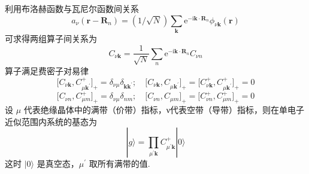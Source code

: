 利用布洛赫函数与瓦尼尔函数间关系
\begin{equation}
  a_{\nu}(\boldsymbol{r}-\boldsymbol{R}_{n})=(1/\sqrt{N})\sum_{\boldsymbol{k}}
  \mathrm{e}^{-\mathrm{i}\boldsymbol{k}\cdot\boldsymbol{R}_{n}}\phi_{\nu\boldsymbol{k}}(\boldsymbol{r})
\end{equation}
可求得两组算子间关系为
\begin{equation}
  C_{\nu\boldsymbol{k}}=\frac{1}{\sqrt{N}}\sum_{n}
  \mathrm{e}^{-\mathrm{i}\boldsymbol{k}\cdot\boldsymbol{R}_{n}}C_{\nu n}
\end{equation}
算子满足费密子对易律
\begin{equation}
  \bigl[C_{\nu\boldsymbol{k}},C_{\mu\boldsymbol{k}^{\prime}}^{+}\bigr]_{+}
  =\delta_{\nu\mu}\delta_{\boldsymbol{k}\boldsymbol{k}^{\prime}};
  \quad
  \bigl[C_{\nu\boldsymbol{k}},C_{\mu\boldsymbol{k}^{\prime}}\bigr]_{+}
  =\bigl[C_{\nu\boldsymbol{k}}^{+},C_{\mu\boldsymbol{k}^{\prime}}^{+}\bigr]_{+}=0
\end{equation}
\begin{equation}
  \bigl[C_{\nu n},C_{\mu m}^{+}\bigr]_{+}
  =\delta_{\nu\mu}\delta_{nm};
  \quad
  \bigl[C_{\nu n},C_{\mu m}\bigr]_{+}
  =\bigl[C_{\nu n}^{+},C_{\mu m}^{+}\bigr]_{+}=0
\end{equation}
设 $\mu$ 代表绝缘晶体中的满带（价带）指标，ν代表空带（导带）指标，则在单电子近似范围内系统的基态为
\begin{equation}
  |g\rangle=\prod_{\mu^{\prime}\boldsymbol{k}}C_{\mu^{\prime}\boldsymbol{k}}^{+}|0\rangle
\end{equation}
这时 $|0\rangle$ 是真空态，$\mu^{\prime}$ 取所有满带的值.

